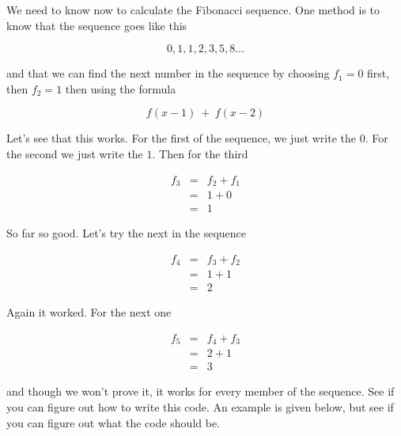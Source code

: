 We need to know now to calculate the Fibonacci sequence. One method is to
know that the sequence goes like this

\begin{equation*}
	0,1,1,2,3,5,8\ldots
\end{equation*}

and that we can find the next number in the sequence by choosing $f_{1}=0$
first, then $f_{2}=1$ then using the formula 

\begin{equation*}
	f(x-1)\ +\ f(x-2)
\end{equation*}

Let's see that this works. For the first of the sequence, we just write the $
0.$ For the second we just write the $1.$ Then for the third 

\begin{eqnarray*}
	f_{3} &=&f_{2}+f_{1} \\
	&=&1+0 \\
	&=&1
\end{eqnarray*}

So far so good. Let's try the next in the sequence

\begin{eqnarray*}
	f_{4} &=&f_{3}+f_{2} \\
	&=&1+1 \\
	&=&2
\end{eqnarray*}

Again it worked. For the next one

\begin{eqnarray*}
	f_{5} &=&f_{4}+f_{3} \\
	&=&2+1 \\
	&=&3
\end{eqnarray*}

and though we won't prove it, it works for every member of the sequence. See
if you can figure out how to write this code. An example is given below, but
see if you can figure out what the code should be.

